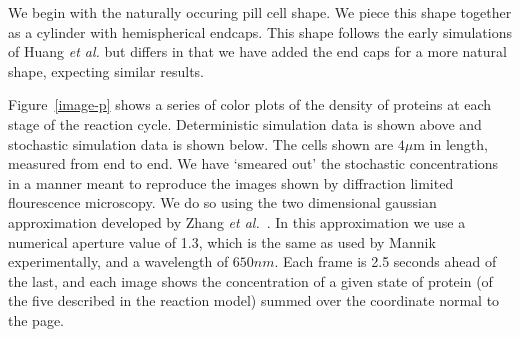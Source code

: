 \documentclass{pnastwo}
\newcommand\micron{\ensuremath{\mu\text{m}}}
\begin{document}
\begin{article}

We begin with the naturally occuring pill cell shape.  We piece this
shape together as a cylinder with hemispherical endcaps.  This shape
follows the early simulations of Huang \emph{et al.} but differs in
that we have added the end caps for a more natural shape, expecting
similar results.

Figure~\ref{image-p} shows a series of color plots of the density of
proteins at each stage of the reaction cycle. Deterministic simulation
data is shown above and stochastic simulation data is shown below.
The cells shown are $4\micron$ in length, measured from end to end.
We have `smeared out' the stochastic concentrations in a manner meant
to reproduce the images shown by diffraction limited flourescence
microscopy.  We do so using the two dimensional gaussian approximation
developed by Zhang \emph{et al.}~\cite{zhang2007gaussian}.  In this
approximation we use a numerical aperture value of 1.3, which is the
same as used by Mannik experimentally, and a wavelength of $650nm$.
Each frame is 2.5 seconds ahead of the last, and each image shows the
concentration of a given state of protein (of the five described in
the reaction model) summed over the coordinate normal to the page.


\end{article}
\end{document}

